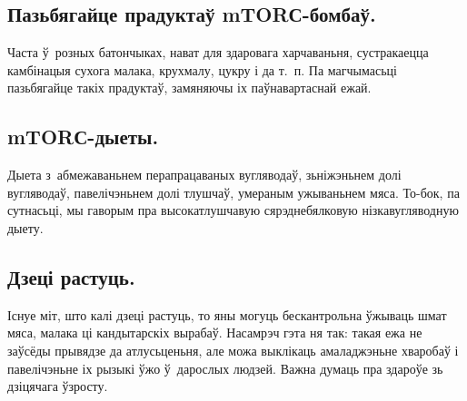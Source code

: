\subsection{Пазьбягайце прадуктаў mTORС-бомбаў.}
Часта ў~розных батончыках, нават для здаровага харчаваньня, сустракаецца камбінацыя сухога малака, крухмалу, цукру і да т.~п. Па магчымасьці пазьбягайце такіх прадуктаў, замяняючы іх паўнавартаснай ежай.

\subsection{mTORС-дыеты.}
Дыета з~абмежаваньнем перапрацаваных вугляводаў, зьніжэньнем долі вугляводаў, павелічэньнем долі тлушчаў, умераным ужываньнем мяса. То-бок, па сутнасьці, мы гаворым пра высокатлушчавую сярэднебялковую нізкавугляводную дыету.

\subsection{Дзеці растуць.}
Існуе міт, што калі дзеці растуць, то яны могуць бескантрольна ўжываць шмат мяса, малака ці кандытарскіх вырабаў. Насамрэч гэта ня так: такая ежа не заўсёды прывядзе да атлусьценьня, але можа выклікаць амаладжэньне хваробаў і павелічэньне іх рызыкі ўжо ў~дарослых людзей. Важна думаць пра здароўе зь дзіцячага ўзросту.
